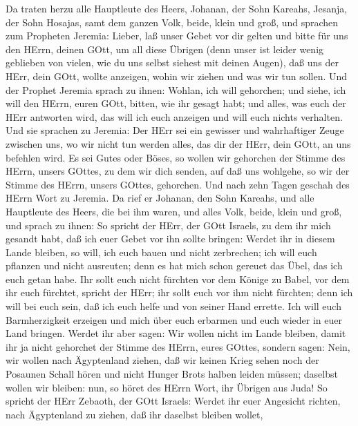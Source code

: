  Da traten herzu alle Hauptleute des Heers, Johanan, der
Sohn Kareahs, Jesanja, der Sohn Hosajas, samt dem ganzen Volk, beide,
klein und groß,  und sprachen zum Propheten Jeremia: Lieber,
laß unser Gebet vor dir gelten und bitte für uns den HErrn, deinen GOtt,
um all diese Übrigen (denn unser ist leider wenig geblieben von vielen,
wie du uns selbst siehest mit deinen Augen),  daß uns der
HErr, dein GOtt, wollte anzeigen, wohin wir ziehen und was wir tun
sollen.  Und der Prophet Jeremia sprach zu ihnen: Wohlan,
ich will gehorchen; und siehe, ich will den HErrn, euren GOtt, bitten,
wie ihr gesagt habt; und alles, was euch der HErr antworten wird, das
will ich euch anzeigen und will euch nichts verhalten.  Und
sie sprachen zu Jeremia: Der HErr sei ein gewisser und wahrhaftiger
Zeuge zwischen uns, wo wir nicht tun werden alles, das dir der HErr,
dein GOtt, an uns befehlen wird.  Es sei Gutes oder Böses,
so wollen wir gehorchen der Stimme des HErrn, unsers GOttes, zu dem wir
dich senden, auf daß uns wohlgehe, so wir der Stimme des HErrn, unsers
GOttes, gehorchen.  Und nach zehn Tagen geschah des HErrn
Wort zu Jeremia.  Da rief er Johanan, den Sohn Kareahs, und
alle Hauptleute des Heers, die bei ihm waren, und alles Volk, beide,
klein und groß,  und sprach zu ihnen: So spricht der HErr,
der GOtt Israels, zu dem ihr mich gesandt habt, daß ich euer Gebet vor
ihn sollte bringen:  Werdet ihr in diesem Lande bleiben, so
will, ich euch bauen und nicht zerbrechen; ich will euch pflanzen und
nicht ausreuten; denn es hat mich schon gereuet das Übel, das ich euch
getan habe.  Ihr sollt euch nicht fürchten vor dem Könige
zu Babel, vor dem ihr euch fürchtet, spricht der HErr; ihr sollt euch
vor ihm nicht fürchten; denn ich will bei euch sein, daß ich euch helfe
und von seiner Hand errette.  Ich will euch Barmherzigkeit
erzeigen und mich über euch erbarmen und euch wieder in euer Land
bringen.  Werdet ihr aber sagen: Wir wollen nicht im Lande
bleiben, damit ihr ja nicht gehorchet der Stimme des HErrn, eures
GOttes,  sondern sagen: Nein, wir wollen nach Ägyptenland
ziehen, daß wir keinen Krieg sehen noch der Posaunen Schall hören und
nicht Hunger Brots halben leiden müssen; daselbst wollen wir bleiben:
 nun, so höret des HErrn Wort, ihr Übrigen aus Juda! So
spricht der HErr Zebaoth, der GOtt Israels: Werdet ihr euer Angesicht
richten, nach Ägyptenland zu ziehen, daß ihr daselbst bleiben wollet,
